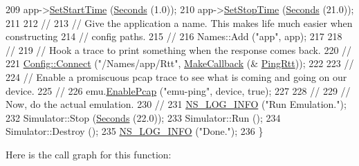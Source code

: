 \begin{DoxyCode}
209   app->\hyperlink{classns3_1_1Application_a8360a49748e30c52ffdcc7a305c3cd48}{SetStartTime} (\hyperlink{group__timecivil_ga33c34b816f8ff6628e33d5c8e9713b9e}{Seconds} (1.0));
210   app->\hyperlink{classns3_1_1Application_a732c1fdadf0be176c753a2ce6e27dff9}{SetStopTime} (\hyperlink{group__timecivil_ga33c34b816f8ff6628e33d5c8e9713b9e}{Seconds} (21.0));
211 
212   \textcolor{comment}{//}
213   \textcolor{comment}{// Give the application a name.  This makes life much easier when constructing}
214   \textcolor{comment}{// config paths.}
215   \textcolor{comment}{//}
216   Names::Add (\textcolor{stringliteral}{"app"}, app);
217 
218   \textcolor{comment}{//}
219   \textcolor{comment}{// Hook a trace to print something when the response comes back.}
220   \textcolor{comment}{//}
221   \hyperlink{group__config_ga4014f151241cd0939b6cb64409605736}{Config::Connect} (\textcolor{stringliteral}{"/Names/app/Rtt"}, \hyperlink{group__makecallbackmemptr_ga9376283685aa99d204048d6a4b7610a4}{MakeCallback} (&
      \hyperlink{fd-emu-ping_8cc_a1a49f760c7e3da367b3406515d2a3ef9}{PingRtt}));
222 
223   \textcolor{comment}{//}
224   \textcolor{comment}{// Enable a promiscuous pcap trace to see what is coming and going on our device.}
225   \textcolor{comment}{//}
226   emu.\hyperlink{classns3_1_1PcapHelperForDevice_a74866def9a881aa9d5c5be1225a26722}{EnablePcap} (\textcolor{stringliteral}{"emu-ping"}, device, \textcolor{keyword}{true});
227 
228   \textcolor{comment}{//}
229   \textcolor{comment}{// Now, do the actual emulation.}
230   \textcolor{comment}{//}
231   \hyperlink{group__logging_gafbd73ee2cf9f26b319f49086d8e860fb}{NS\_LOG\_INFO} (\textcolor{stringliteral}{"Run Emulation."});
232   Simulator::Stop (\hyperlink{group__timecivil_ga33c34b816f8ff6628e33d5c8e9713b9e}{Seconds} (22.0));
233   Simulator::Run ();
234   Simulator::Destroy ();
235   \hyperlink{group__logging_gafbd73ee2cf9f26b319f49086d8e860fb}{NS\_LOG\_INFO} (\textcolor{stringliteral}{"Done."});
236 \}
\end{DoxyCode}


Here is the call graph for this function\+:


